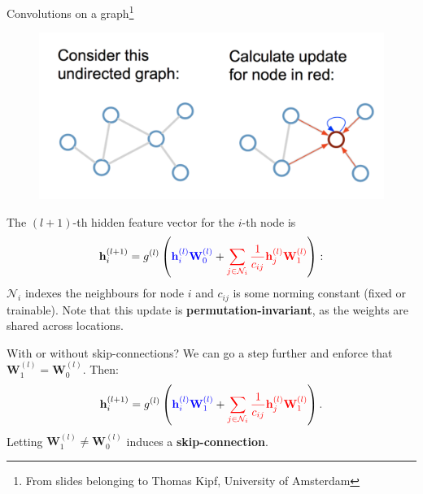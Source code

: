 \documentclass{beamer}
\begin{document}
\begin{frame}{Convolutions on a graph\footnote{From slides belonging to Thomas Kipf, University of Amsterdam}}

\begin{figure}
\includegraphics[width=0.525\linewidth]{Images/GCNN.png}
\end{figure}
The $(l+1)$-th hidden feature vector for the $i$-th node is
\[
\mathbf{h}_i^{(l+1)}=g^{(l)}\left({\color{blue}\mathbf{h}_i^{(l)}\mathbf{W}_0^{(l)}}+{\color{red}\sum_{j\in\mathcal{N}_i}\frac{1}{c_{ij}}\mathbf{h}_j^{(l)}\mathbf{W}_1^{(l)}}\right):
\]
$\mathcal{N}_i$ indexes the neighbours for node $i$ and $c_{ij}$ is some norming constant (fixed or trainable). Note that this update is \textbf{permutation-invariant}, as the weights are shared across locations.
\end{frame}


\begin{frame}{With or without skip-connections?}
We can go a step further and enforce that $\mathbf{W}_1^{(l)}=\mathbf{W}_0^{(l)}$.  Then:
\[
\mathbf{h}_i^{(l+1)}=g^{(l)}\left({\color{blue}\mathbf{h}_i^{(l)}\mathbf{W}_1^{(l)}}+{\color{red}\sum_{j\in\mathcal{N}_i}\frac{1}{c_{ij}}\mathbf{h}_j^{(l)}\mathbf{W}_1^{(l)}}\right).
\]
Letting $\mathbf{W}_1^{(l)}\neq \mathbf{W}_0^{(l)}$ induces a \textbf{skip-connection}.
\end{frame}
\end{document}
